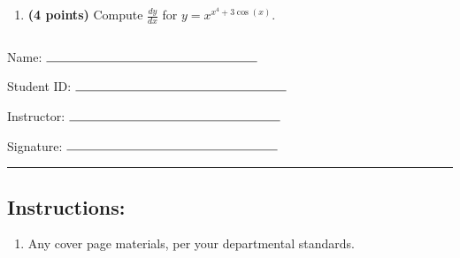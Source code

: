 \documentclass[12pt]{amsart}
\begin{document}
\begin{enumerate}
\vfill 
\def \varexp{4}\def \newexp{3}\def \trigcoeff{3}\def \trigval{+3}\def \oppval{-3}
\item {\bf (4 points)} 
 Compute $\frac{dy}{dx}$ for $y=x^{x^\varexp \trigval \cos(x)}$.

\vfill 
\newpage  $ $   \newpage\end{enumerate}\graphicspath{{C:/Users/iainc/anaconda3/Randomizer/MATH 1001/Midterm 1/}}\setcounter{page}{1}


\thispagestyle{fancy}

 
\noindent Name: $\rule{6cm}{0.15mm}$

\vspace{.2cm}

\noindent Student ID: $\rule{6cm}{0.15mm}$

\vspace{.2cm}

\noindent Instructor: $\rule{6cm}{0.15mm}$

\vspace{.2cm}

\noindent Signature: $\rule{6cm}{0.15mm}$
 



\vspace{.4cm}


\vspace{.4cm}

\hrule

\subsection*{Instructions:} \begin{enumerate}[1.]
\item Any cover page materials, per your departmental standards.
\end{enumerate}
\end{document}
